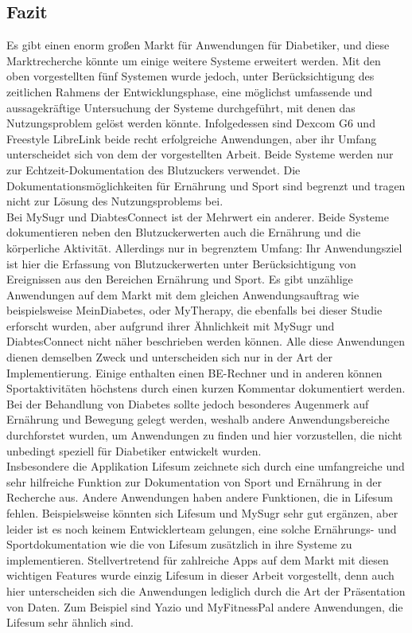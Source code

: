 	\subsection{Fazit}
	Es gibt einen enorm großen Markt für Anwendungen für Diabetiker, und diese Marktrecherche könnte um einige weitere Systeme erweitert werden. Mit den oben vorgestellten fünf Systemen wurde jedoch, unter Berücksichtigung des zeitlichen Rahmens der Entwicklungsphase, eine möglichst umfassende und aussagekräftige Untersuchung der Systeme durchgeführt, mit denen das Nutzungsproblem gelöst werden könnte. Infolgedessen sind Dexcom G6 und Freestyle LibreLink beide recht erfolgreiche Anwendungen, aber ihr Umfang unterscheidet sich von dem der vorgestellten Arbeit. Beide Systeme werden nur zur Echtzeit-Dokumentation des Blutzuckers verwendet. Die Dokumentationsmöglichkeiten für Ernährung und Sport sind begrenzt und tragen nicht zur Lösung des Nutzungsproblems bei.\\
	Bei MySugr und DiabtesConnect ist der Mehrwert ein anderer. Beide Systeme dokumentieren neben den Blutzuckerwerten auch die Ernährung und die körperliche Aktivität. Allerdings nur in begrenztem Umfang: Ihr Anwendungsziel ist hier die Erfassung von Blutzuckerwerten unter Berücksichtigung von Ereignissen aus den Bereichen Ernährung und Sport. Es gibt unzählige Anwendungen auf dem Markt mit dem gleichen Anwendungsauftrag wie beispielsweise MeinDiabetes, oder MyTherapy, die ebenfalls bei dieser Studie erforscht wurden, aber aufgrund ihrer Ähnlichkeit mit MySugr und DiabtesConnect nicht näher beschrieben werden können. Alle diese Anwendungen dienen demselben Zweck und unterscheiden sich nur in der Art der Implementierung. Einige enthalten einen BE-Rechner und in anderen können Sportaktivitäten höchstens durch einen kurzen Kommentar dokumentiert werden. Bei der Behandlung von Diabetes sollte jedoch besonderes Augenmerk auf Ernährung und Bewegung gelegt werden, weshalb andere Anwendungsbereiche durchforstet wurden, um Anwendungen zu finden und hier vorzustellen, die nicht unbedingt speziell für Diabetiker entwickelt wurden.\\
	Insbesondere die Applikation Lifesum zeichnete sich durch eine umfangreiche und sehr hilfreiche Funktion zur Dokumentation von Sport und Ernährung in der Recherche aus. Andere Anwendungen haben andere Funktionen, die in Lifesum fehlen. Beispielsweise könnten sich Lifesum und MySugr sehr gut ergänzen, aber leider ist es noch keinem Entwicklerteam gelungen, eine solche Ernährungs- und Sportdokumentation wie die von Lifesum zusätzlich in ihre Systeme zu implementieren. Stellvertretend für zahlreiche Apps auf dem Markt mit diesen wichtigen Features wurde einzig Lifesum  in dieser Arbeit vorgestellt, denn auch hier unterscheiden sich die Anwendungen lediglich durch die Art der Präsentation von Daten. Zum Beispiel sind Yazio und MyFitnessPal andere Anwendungen, die Lifesum sehr ähnlich sind.\\
